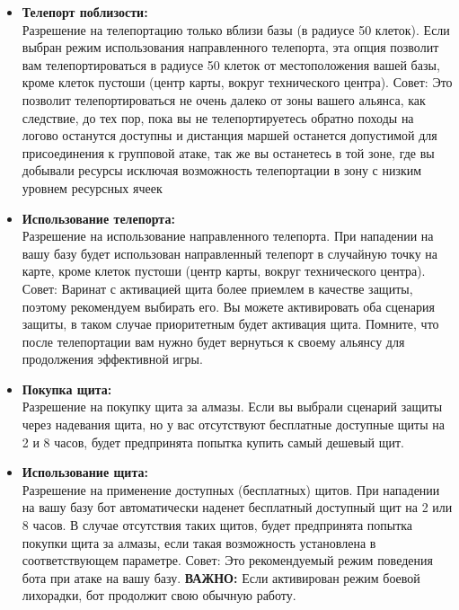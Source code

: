 \documentclass[
]{article}
\begin{document}
\begin{itemize}
\item
  \textbf{Телепорт поблизости:}\\
  Разрешение на телепортацию только вблизи базы (в радиусе 50 клеток).
  Если выбран режим использования направленного телепорта, эта опция
  позволит вам телепортироваться в радиусе 50 клеток от местоположения
  вашей базы, кроме клеток пустоши (центр карты, вокруг технического
  центра). Совет: Это позволит телепортироваться не очень далеко от зоны
  вашего альянса, как следствие, до тех пор, пока вы не телепортируетесь
  обратно походы на логово останутся доступны и дистанция маршей
  останется допустимой для присоединения к групповой атаке, так же вы
  останетесь в той зоне, где вы добывали ресурсы исключая возможность
  телепортации в зону с низким уровнем ресурсных ячеек
\item
  \textbf{Использование телепорта:}\\
  Разрешение на использование направленного телепорта. При нападении на
  вашу базу будет использован направленный телепорт в случайную точку на
  карте, кроме клеток пустоши (центр карты, вокруг технического центра).
  Совет: Варинат с активацией щита более приемлем в качестве защиты,
  поэтому рекомендуем выбирать его. Вы можете активировать оба сценария
  защиты, в таком случае приоритетным будет активация щита. Помните, что
  после телепортации вам нужно будет вернуться к своему альянсу для
  продолжения эффективной игры.
\item
  \textbf{Покупка щита:}\\
  Разрешение на покупку щита за алмазы. Если вы выбрали сценарий защиты
  через надевания щита, но у вас отсутствуют бесплатные доступные щиты
  на 2 и 8 часов, будет предпринята попытка купить самый дешевый щит.
\item
  \textbf{Использование щита:}\\
  Разрешение на применение доступных (бесплатных) щитов. При нападении
  на вашу базу бот автоматически наденет бесплатный доступный щит на 2
  или 8 часов. В случае отсутствия таких щитов, будет предпринята
  попытка покупки щита за алмазы, если такая возможность установлена в
  соответствующем параметре. Совет: Это рекомендуемый режим поведения
  бота при атаке на вашу базу. \textbf{{ВАЖНО:}} Если активирован режим
  боевой лихорадки, бот продолжит свою обычную работу.
\end{itemize}
\end{document}
